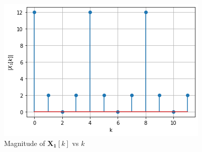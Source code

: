 \documentclass{beamer}
\renewcommand{\vec}[1]{\mathbf{#1}}
\begin{document}
\begin{frame}
\begin{figure}[!ht]
    \centering
    \includegraphics[width=0.9\columnwidth] {Gate_Assignment_1_Fig_2.png}
    \caption{Magnitude of $\vec{X_{1}}[k]$ vs $k$}
    \label{Magnitude of X1[k]}
\end{figure}
\end{frame}
\end{document}
